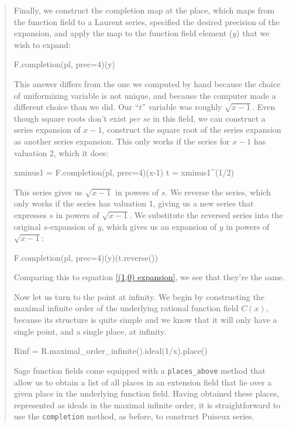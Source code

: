 \begin{examplecont}
\begin{quote}
Finally, we construct the completion map at the place, which maps from the function
field to a Laurent series, specified the desired precision of the expansion,
and apply the map to the function field element ($y$) that we wish to expand:

\begin{sageblock}[ch7]
F.completion(pl, prec=4)(y)
\end{sageblock}

This answer differs from the one we computed by hand because the
choice of uniformizing variable is not unique, and because the
computer made a different choice than we did.  Our ``$t$'' variable
was roughly $\sqrt{x-1}$.  Even though square roots don't exist {\it
per se} in this field, we can construct a series expansion of $x-1$,
construct the square root of the series expansion as another series expansion.
This only works if the series for $x-1$ has valuation 2, which it does:

\begin{sageblock}[ch7]
xminus1 = F.completion(pl, prec=4)(x-1)
t = xminus1^(1/2)
\end{sageblock}

This series gives us $\sqrt{x-1}$ in powers of $s$.
We reverse the series, which only works if the series has valuation 1,
giving us a new series that expresses $s$ in powers of $\sqrt{x-1}$.
We substitute the reversed series into the original $s$-expansion of $y$,
which gives us an expansion of $y$ in powers of $\sqrt{x-1}$:

\begin{sageblock}[ch7]
F.completion(pl, prec=4)(y)(t.reverse())
\end{sageblock}

Comparing this to equation \ref{(1,0) expansion}, we see that they're the same.

Now let us turn to the point at infinity.  We begin by constructing the
maximal infinite order of the underlying rational function field $C(x)$,
because its structure is quite simple and we know that it will only have a single point,
and a single place, at infinity.

\begin{sageblock}[ch7]
Rinf = R.maximal_order_infinite().ideal(1/x).place()
\end{sageblock}

Sage function fields come equipped with a {\tt places\_above} method that
allow us to obtain a list of all places in an extension field that lie
over a given place in the underlying function field.  Having obtained
these places, represented as ideals in the maximal infinite order,
it is straightforward to use the {\tt completion} method, as before,
to construct Puiseux series.


\end{quote}
\end{examplecont}
